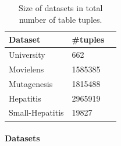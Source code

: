 \documentclass{article}
\begin{document}
\begin{table}[btp] \centering
\begin{tabular}[c]
{|l|l|l|}\hline
    \textbf{Dataset} & \textbf{\#tuples} \\\hline
    University&662\\\hline
    Movielens &1585385\\\hline
    Mutagenesis &1815488\\\hline
    Hepatitis &2965919\\\hline
    Small-Hepatitis & 19827 \\\hline
\end{tabular}
\caption{Size of datasets in total number of table tuples. 
 \label{table:datasetsize}}
\end{table}



\paragraph{Datasets}
\end{document}
